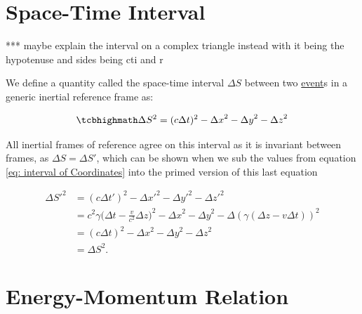 \section{Space-Time Interval} \label{sect: Space-Time Interval}

*** maybe explain the interval on a complex triangle instead with it being the hypotenuse and sides being cti and r

We define a quantity called the space-time interval $\Delta S$ between two \hyperlink{def-event}{event}s in a generic inertial reference frame as:

\begin{equation}
	\mhl{
	\Delta S^2 = (c\Delta t)^2-{\Delta x}^2-{\Delta y}^2-{\Delta z}^2
	}
	\label{eq: space-time interval}
\end{equation}

All inertial frames of reference agree on this interval as it is invariant between frames, as $\Delta S = \Delta S{'}$, which can be shown when we sub the values from equation \eqref{eq: interval of Coordinates} into the primed version of this last equation

\begin{equation}
	\begin{aligned}
		\Delta S{'}^2 & = (c{\Delta t{'}})^2-\Delta x{'}^2-{\Delta y{'}}^2-{\Delta z{'}}^2                                                                           \\
		              & = {c}^2{\gamma} \bigg( \Delta t-\frac{v}{{c}^2} {\Delta z} \bigg)^2-{\Delta x}^2-{\Delta y}^2-\Delta ({\gamma} ( {\Delta z}- {v} \Delta t) )^2 \\
		              & = (c\Delta t)^2-{\Delta x}^2-{\Delta y}^2-{\Delta z}^2                                                                                       \\
		              & = \Delta S^2.
	\end{aligned}
\end{equation}

\section{Energy-Momentum Relation} \label{sect: Energy-Momentum Relation}

